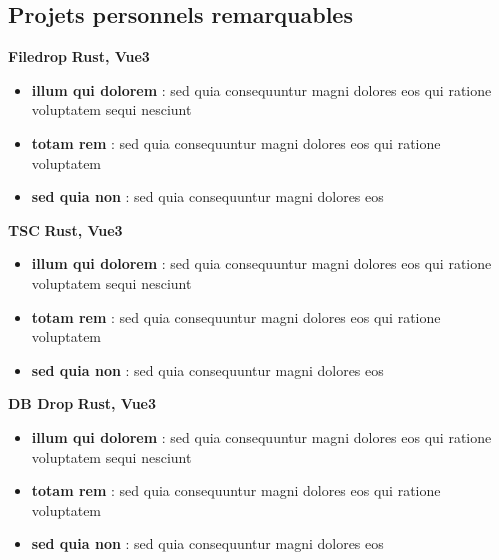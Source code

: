 \documentclass[a4paper,10pt]{article}
\begin{document}
\begin{paracol}{2}
\begin{flushleft}
  \section*{Projets personnels remarquables}

  \textbf{Filedrop} \hfill \textbf{Rust, Vue3} \\
  \begin{itemize}[left=0pt,label={--},nosep]
    \item \textbf{illum qui dolorem} : sed quia consequuntur magni dolores eos qui ratione voluptatem sequi nesciunt
    \item \textbf{totam rem} : sed quia consequuntur magni dolores eos qui ratione voluptatem
    \item \textbf{sed quia non} : sed quia consequuntur magni dolores eos
  \end{itemize}
  \vspace{1em}

  \textbf{TSC} \hfill \textbf{Rust, Vue3} \\
  \begin{itemize}[left=0pt,label={--},nosep]
    \item \textbf{illum qui dolorem} : sed quia consequuntur magni dolores eos qui ratione voluptatem sequi nesciunt
    \item \textbf{totam rem} : sed quia consequuntur magni dolores eos qui ratione voluptatem
    \item \textbf{sed quia non} : sed quia consequuntur magni dolores eos
  \end{itemize}
  \vspace{1em}

  \textbf{DB Drop} \hfill \textbf{Rust, Vue3} \\
  \begin{itemize}[left=0pt,label={--},nosep]
    \item \textbf{illum qui dolorem} : sed quia consequuntur magni dolores eos qui ratione voluptatem sequi nesciunt
    \item \textbf{totam rem} : sed quia consequuntur magni dolores eos qui ratione voluptatem
    \item \textbf{sed quia non} : sed quia consequuntur magni dolores eos
  \end{itemize}
  \vspace{1em}

  \end{flushleft}
  
\end{paracol}
\end{document}
